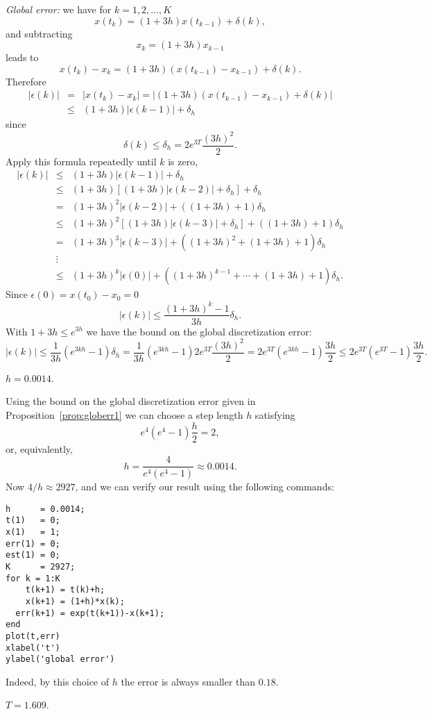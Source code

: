 {\em Global error:} we have for $k=1,2,\ldots,K$
\[
x(t_k)=(1+3h)x(t_{k-1})+\delta(k),
\]
and subtracting
\[
x_k = (1+3h)x_{k-1}
\]
leads to
\[
x(t_k) - x_k = (1+3h)(x(t_{k-1})-x_{k-1})+\delta(k).
\]
Therefore
\begin{eqnarray*}
|\epsilon(k)| & = & |x(t_k) - x_k| =
|(1+3h)(x(t_{k-1})-x_{k-1})+\delta(k)|\\
& \le & (1+3h)|\epsilon(k-1)|+\delta_h
\end{eqnarray*}
since
\[
\delta(k)\le \delta_h = 2e^{3T}\frac{(3h)^2}{2}.
\]
Apply this formula repeatedly until $k$ is zero,
\[
\begin{array}{rcl}
|\epsilon(k)|&\le&(1+3h)|\epsilon(k-1)|+\delta_h\\
&\le& (1+3h)[(1+3h)|\epsilon(k-2)|+\delta_h]+\delta_h\\
&=& (1+3h)^2|\epsilon(k-2)| + ((1+3h) + 1)\delta_h\\
&\le& (1+3h)^2[(1+3h)|\epsilon(k-3)|+\delta_h] + ((1+3h) + 1)\delta_h\\
&=& (1+3h)^3|\epsilon(k-3)| + ((1+3h)^2 + (1+3h) + 1)\delta_h\\
&\vdots& \\
&\le & (1+3h)^k|\epsilon(0)| + ((1+3h)^{k-1} +\cdots + (1+3h) + 1)\delta_h.
\end{array}
\]
Since $\epsilon(0)=x(t_0) - x_0=0$
\[
|\epsilon(k)| \le \frac{(1+3h)^k -1}{3h}\delta_h.
\]
With $1+3h\le e^{3h}$ we have the bound on the global discretization error:
\[
|\epsilon(k)| \le \frac{1}{3h} (e^{3kh}-1)\delta_h=
\frac{1}{3h}(e^{3kh}-1)2e^{3T}\frac{(3h)^2}{2} =
2e^{3T}(e^{3kh}-1)\frac{3h}{2}
\le 2e^{3T}(e^{3T}-1)\frac{3h}{2}.
\]

 \ans $h=0.0014$.

\soln Using the bound on the global discretization error
given in Proposition~\ref{prop:globerr1} we can choose a
step length $h$ satisfying
\[
e^4(e^4-1)\frac{h}{2} = 2,
\]
or, equivalently,
\[
h = \frac{4}{e^4(e^4-1)} \approx 0.0014.
\]
Now $4/h \approx 2927$, and we can verify our result using the
following \Matlab commands:
\begin{verbatim}
h      = 0.0014;
t(1)   = 0;
x(1)   = 1;
err(1) = 0;
est(1) = 0;
K      = 2927;
for k = 1:K
    t(k+1) = t(k)+h;
    x(k+1) = (1+h)*x(k);
  err(k+1) = exp(t(k+1))-x(k+1);
end
plot(t,err)
xlabel('t')
ylabel('global error')
\end{verbatim}
Indeed, by this choice of $h$ the error is always smaller than $0.18$.

 \ans $T=1.609$.


